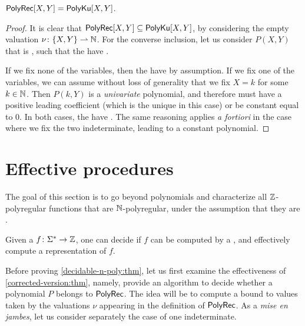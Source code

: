\documentclass[sigconf,natbib=false,screen, review,anonymous]{acmart}
\begin{document}
\begin{lemma}
    \label{lem:correct-covered-2}
    $\mathsf{PolyRec}[X,Y] = \mathsf{PolyKu}[X,Y]$.
\end{lemma}
\begin{proof}
    It is clear that $\mathsf{PolyRec}[X,Y] \subseteq \mathsf{PolyKu}[X,Y]$,
    by considering the empty valuation $\nu \colon \mathopen{\{} X,Y \mathclose{\}} \rightharpoonup \mathbb{N}$.
    For the converse inclusion, let us consider $P(X,Y)$
    that is , such that the 
    have .
   

    If we fix none of the variables, then the 
    have  by assumption. If we fix one of the
    variables, we can assume without loss of generality that we 
    fix $X = k$ for some $k \in \mathbb{N}$.
    Then $P(k,Y)$ is a  \emph{univariate} polynomial, 
    and therefore must have a positive leading coefficient
    (which is the unique  in this case)
    or be constant equal to 0. In both cases, the 
    have .
    The same reasoning applies \emph{a fortiori} in the case where
    we fix the two indeterminate, leading to a constant polynomial.
\end{proof}

\section{Effective procedures}
\label{sec:deciding}

The goal of this section is to go beyond polynomials and characterize all
$\mathbb{Z}$-polyregular functions that are $\mathbb{N}$-polyregular, under the assumption
that they are .

\begin{theorem}
    \label{decidable-n-poly:thm}
    Given a 
     $f \colon \Sigma^* \to \mathbb{Z}$,
    one can decide if $f$ can be computed by a ,
    and effectively compute a representation of $f$.
\end{theorem}

Before proving \cref{decidable-n-poly:thm}, let us first examine the
effectiveness of \cref{corrected-version:thm}, namely, provide an algorithm to
decide whether a polynomial $P$ belongs to $\mathsf{PolyRec}$. The idea will be to
compute a bound to values taken by the valuations $\nu$ appearing in the
definition of $\mathsf{PolyRec}$. As a \emph{mise en jambes}, let us consider
separately the case of one indeterminate.
\end{document}
